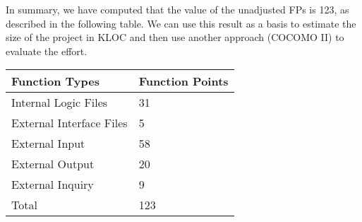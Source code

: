 In summary, we have computed that the value of the unadjusted FPs is 123, as described in the following table. We can use this result as a basis to estimate the size of the project in KLOC and then use another approach (COCOMO II) to evaluate the effort.
\newline
\begin{table}[H]
    \centering
    \begin{tabular}{|l|l|}
        \hline
        Function Types & Function Points \\
        \hline
        Internal Logic Files & 31 \\
        \hline
        External Interface Files & 5 \\
        \hline
        External Input & 58 \\
        \hline
        External Output & 20 \\
        \hline
        External Inquiry & 9 \\
        \hline
        Total & 123 \\
        \hline
    \end{tabular}
\end{table}


